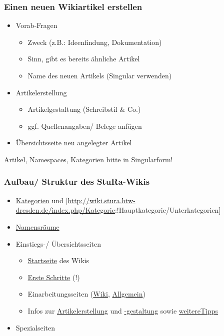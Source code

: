 \documentclass{beamer}
\begin{document}
\begin{frame}
  \frametitle{Einen neuen Wikiartikel erstellen}
  \begin{itemize}
    \item Vorab-Fragen
    \begin{itemize}
      \item Zweck (z.B.: Ideenfindung, Dokumentation)
      \item Sinn, gibt es bereits ähnliche Artikel
      \item Name des neuen Artikels (Singular verwenden)
    \end{itemize}
    \item Artikelerstellung
    \begin{itemize}
      \item Artikelgestaltung (Schreibstil \& Co.)
      \item ggf. Quellenangaben/ Belege anfügen
    \end{itemize}
    \item Übersichtsseite neu angelegter Artikel
  \end{itemize}
  Artikel, Namespaces, Kategorien bitte in Singularform!
\end{frame}


\begin{frame}
  \frametitle{Aufbau/ Struktur des StuRa-Wikis}
  \begin{itemize}
    \item \href{http://wiki.stura.htw-dresden.de/index.php/Spezial:Kategorien}{Kategorien} und [\url{http://wiki.stura.htw-dresden.de/index.php/Kategorie}:!Hauptkategorie/Unterkategorien]
    \item \href{http://wiki.stura.htw-dresden.de/index.php/Admin:Namensr\%C3\%A4ume}{Namensräume}
    \item Einstiegs-/ Übersichtsseiten
    \begin{itemize}
      \item \href{http://wiki.stura.htw-dresden.de/index.php/Hauptseite}{Startseite} des Wikis
      \item \href{http://wiki.stura.htw-dresden.de/index.php/StuRa_HTW_Dresden:Erste_Schritte}{Erste Schritte} (!)
      \item Einarbeitungsseiten (\href{http://wiki.stura.htw-dresden.de/index.php/Wiki/Einarbeitung}{Wiki}, \href{http://wiki.stura.htw-dresden.de/index.php/Einarbeitung}{Allgemein})
      \item Infos zur \href{http://wiki.stura.htw-dresden.de/index.php/Artikelerstellung}{Artikelerstellung} und \href{http://wiki.stura.htw-dresden.de/index.php/Admin:Artikelgestaltung}{-gestaltung} sowie \href{https://de.wikipedia.org/wiki/Wikipedia:Wie_schreibe_ich_gute_Artikel}{weitereTipps}
    \end{itemize}
    \item Spezialseiten
  \end{itemize}
\end{frame}
\end{document}
